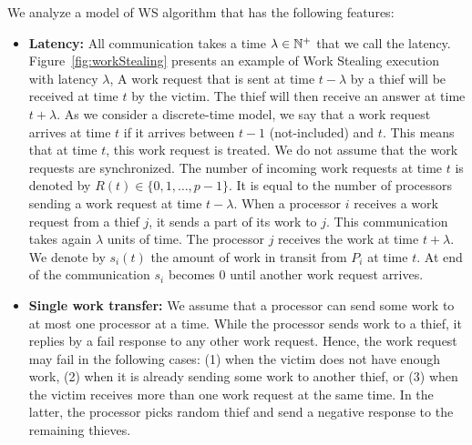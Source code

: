 We analyze a model of WS algorithm that has the following features:
\begin{itemize}

\item \textbf{Latency:} All communication takes a time
  $\lambda\in\mathbb{N}^+$ that we call the latency.
  Figure~\ref{fig:workStealing} presents an example of Work Stealing
  execution with latency $\lambda$, A work request that is sent at
  time $t-\lambda$ by a thief will be received at time $t$ by the
  victim.  The thief will then receive an answer at time $t+\lambda$.
  As we consider a discrete-time model, we say that a work request
  arrives at time $t$ if it arrives between $t-1$ (not-included) and
  $t$.  This means that at time $t$, this work request is treated. We
  do not assume that the work requests are synchronized.  The number
  of incoming work requests at time $t$ is denoted by
  $R(t)\in\{0,1,\dots,p-1\}$. It is equal to the number of processors
  sending a work request at time $t - \lambda$.  When a processor $i$
  receives a work request from a thief $j$, it sends a part of its
  work to $j$. This communication takes again $\lambda$ units of time.
  The processor $j$ receives the work at time $t+\lambda$.  We denote
  by $s_{i}(t)$ the amount of work in transit from $P_i$ at time $t$.
  At end of the communication $s_{i}$ becomes 0 until another work
  request arrives.
  
\item \textbf{Single work transfer:} We assume that a processor can
  send some work to at most one processor at a time.  While the
  processor sends work to a thief, it replies by a fail response to
  any other work request. Hence, the work request may fail in the
  following cases: (1) when the victim does not have enough work, (2)
  when it is already sending some work to another thief, or (3) when
  the victim receives more than one work request at the same time. In
  the latter, the processor picks random thief and send a negative
  response to the remaining thieves.
  


\end{itemize}
